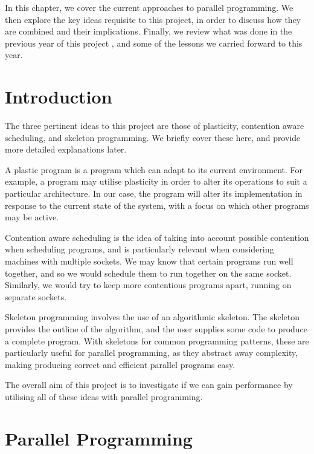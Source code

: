 
In this chapter, we cover the current approaches to parallel programming. We then explore the key ideas requisite to this project, in order to discuss how they are combined and their implications. Finally, we review what was done in the previous year of this project \cite{me}, and some of the lessons we carried forward to this year.

\section{Introduction}
\label{section:background:introduction}

The three pertinent ideas to this project are those of plasticity, contention aware scheduling, and skeleton programming. We briefly cover these here, and provide more detailed explanations later.

A plastic program is a program which can adapt to its current environment. For example, a program may utilise plasticity in order to alter its operations to suit a particular architecture. In our case, the program will alter its implementation in response to the current state of the system, with a focus on which other programs may be active.

Contention aware scheduling is the idea of taking into account possible contention when scheduling programs, and is particularly relevant when considering machines with multiple sockets. We may know that certain programs run well together, and so we would schedule them to run together on the same socket. Similarly, we would try to keep more contentious programs apart, running on separate sockets.

Skeleton programming involves the use of an algorithmic skeleton. The skeleton provides the outline of the algorithm, and the user supplies some code to produce a complete program. With skeletons for common programming patterns, these are particularly useful for parallel programming, as they abstract away complexity, making producing correct and efficient parallel programs easy.

The overall aim of this project is to investigate if we can gain performance by utilising all of these ideas with parallel programming. 



\section{Parallel Programming}
\label{section:background:parallel_programming}

